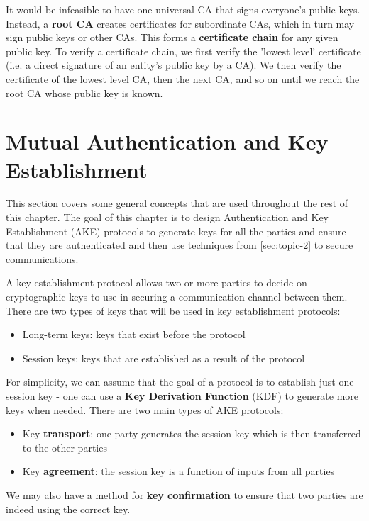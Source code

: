 \documentclass[11pt]{report}
\begin{document}
It would be infeasible to have one universal CA that signs everyone's public keys. Instead, a \textbf{root CA} creates certificates for subordinate CAs, which in turn may sign public keys or other CAs. This forms a \textbf{certificate chain} for any given public key. To verify a certificate chain, we first verify the 'lowest level' certificate (i.e. a direct signature of an entity's public key by a CA). We then verify the certificate of the lowest level CA, then the next CA, and so on until we reach the root CA whose public key is known.

\section{Mutual Authentication and Key Establishment}
This section covers some general concepts that are used throughout the rest of this chapter. The goal of this chapter is to design Authentication and Key Establishment (AKE) protocols to generate keys for all the parties and ensure that they are authenticated and then use techniques from \autoref{sec:topic-2} to secure communications.

A key establishment protocol allows two or more parties to decide on cryptographic keys to use in securing a communication channel between them. There are two types of keys that will be used in key establishment protocols:

\begin{itemize}
	\item Long-term keys: keys that exist before the protocol
	\item Session keys: keys that are established as a result of the protocol
\end{itemize}

For simplicity, we can assume that the goal of a protocol is to establish just one session key - one can use a \textbf{Key Derivation Function} (KDF) to generate more keys when needed. There are two main types of AKE protocols:

\begin{itemize}
	\item Key \textbf{transport}: one party generates the session key which is then transferred to the other parties
	\item Key \textbf{agreement}: the session key is a function of inputs from all parties
\end{itemize}

We may also have a method for \textbf{key confirmation} to ensure that two parties are indeed using the correct key.
\end{document}
